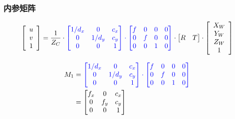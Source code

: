 \documentclass[aspectratio=43]{beamer}
\begin{document}
	\begin{frame}
	\frametitle{内参矩阵}
	\begin{gather*}
\left[ \begin{array}{c}
	u\\
	v\\
	1\\
\end{array} \right] =\frac{1}{Z_C}\cdot {\color{blue} \left[ \begin{matrix}
		1/d_x&		0&		c_x\\
		0&		1/d_y&		c_y\\
		0&		0&		1\\
	\end{matrix} \right] \cdot \left[ \begin{matrix}
		f&		0&		0&		0\\
		0&		f&		0&		0\\
		0&		0&		1&		0\\
	\end{matrix} \right] }\cdot \left[ \begin{matrix}
	R&		T\\
\end{matrix} \right] \cdot \left[ \begin{array}{c}
	X_W\\
	Y_W\\
	Z_W\\
	1\\
\end{array} \right]  
	\end{gather*}

	\begin{align}
M_1&={\color{blue} \left[ \begin{matrix}
		1/d_x&		0&		c_x\\
		0&		1/d_y&		c_y\\
		0&		0&		1\\
	\end{matrix} \right] \cdot \left[ \begin{matrix}
		f&		0&		0&		0\\
		0&		f&		0&		0\\
		0&		0&		1&		0\\
	\end{matrix} \right] } \nonumber
\\
&=\left[ \begin{matrix}
	f_x&		0&		c_x\\
	0&		f_y&		c_y\\
	0&		0&		1\\
\end{matrix} \right] \label{内参矩阵求解-内参矩阵}
	\end{align}	

	\end{frame}
\end{document}
